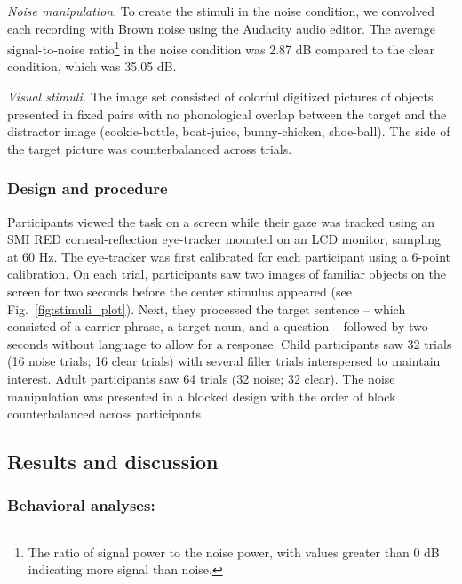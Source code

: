 \documentclass[english,man]{apa6}
\theoremstyle{definition}
\theoremstyle{definition}
\theoremstyle{definition}
\theoremstyle{remark}
\begin{document}
\emph{Noise manipulation}. To create the stimuli in the noise condition,
we convolved each recording with Brown noise using the Audacity audio
editor. The average signal-to-noise ratio\footnote{The ratio of signal
  power to the noise power, with values greater than 0 dB indicating
  more signal than noise.} in the noise condition was 2.87 dB compared
to the clear condition, which was 35.05 dB.

\emph{Visual stimuli.} The image set consisted of colorful digitized
pictures of objects presented in fixed pairs with no phonological
overlap between the target and the distractor image (cookie-bottle,
boat-juice, bunny-chicken, shoe-ball). The side of the target picture
was counterbalanced across trials.

\hypertarget{design-and-procedure-2}{%
\subsubsection{Design and procedure}\label{design-and-procedure-2}}

Participants viewed the task on a screen while their gaze was tracked
using an SMI RED corneal-reflection eye-tracker mounted on an LCD
monitor, sampling at 60 Hz. The eye-tracker was first calibrated for
each participant using a 6-point calibration. On each trial,
participants saw two images of familiar objects on the screen for two
seconds before the center stimulus appeared (see
Fig.~\ref{fig:stimuli_plot}). Next, they processed the target sentence
-- which consisted of a carrier phrase, a target noun, and a question --
followed by two seconds without language to allow for a response. Child
participants saw 32 trials (16 noise trials; 16 clear trials) with
several filler trials interspersed to maintain interest. Adult
participants saw 64 trials (32 noise; 32 clear). The noise manipulation
was presented in a blocked design with the order of block
counterbalanced across participants.

\hypertarget{results-and-discussion-3}{%
\subsection{Results and discussion}\label{results-and-discussion-3}}

\hypertarget{behavioral-analyses-2}{%
\subsubsection{Behavioral analyses:}\label{behavioral-analyses-2}}
\end{document}
